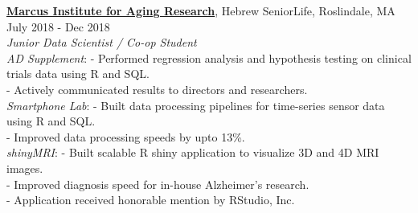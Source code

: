 \documentclass[a4paper]{article}
\newcommand{\mybullet}{
	\indent 
  \textbullet \hspace*{2mm}
}
\begin{document}

  \noindent
  \textbf{\href{https://www.marcusinstituteforaging.org/}{Marcus Institute for Aging Research}}, 
  Hebrew SeniorLife, Roslindale, MA 
  \hfill July 2018 - Dec 2018 \\
        \textit{Junior Data Scientist / Co-op Student} \\
        \mybullet \textit{AD Supplement}: 
        \hspace*{3.7 mm} - Performed regression analysis and hypothesis testing
        on clinical trials data using R and SQL. \\
        \hspace*{37.5 mm} - Actively communicated results to directors and researchers.  \\
        \mybullet \textit{Smartphone Lab}: 
        \hspace* {2.3 mm} - Built data processing pipelines for time-series sensor data using R and SQL. \\
        \hspace*{37.5 mm} - Improved data processing speeds by upto 13\%. \\ 
        \mybullet \textit{shinyMRI}: 
        \hspace* {12.7 mm} - Built scalable R shiny application to visualize 3D and 4D MRI images. \\
        \hspace*{37.5 mm} - Improved diagnosis speed for in-house Alzheimer's research. \\
        \hspace*{37.5 mm} - Application received honorable mention by RStudio, Inc. \\
        
	
\end{document}
